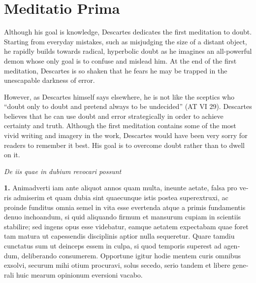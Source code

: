 \chapter{Meditatio Prima}


Although his goal is knowledge, Descartes dedicates the first meditation to doubt. Starting from everyday mistakes, such as misjudging the size of a distant object, he rapidly builds towards radical, hyperbolic doubt as he imagines an all-powerful demon whose only goal is to confuse and mislead him. At the end of the first meditation, Descartes is so shaken that he fears he may be trapped in the unescapable darkness of error.

However, as Descartes himself says elsewhere, he is not like the sceptics who ``doubt only to doubt and pretend always to be undecided'' (AT VI 29). Descartes believes that he can use doubt and error strategically in order to achieve certainty and truth. Although the first meditation contains some of the most vivid writing and imagery in the work, Descartes would have been very sorry for readers to remember it best. His goal is to overcome doubt rather than to dwell on it.

\clearpage
\begin{center}
    \beginnumbering
    \numberlinefalse
    \pstart
    \textit{De iis quae in dubium revocari possunt}
    \pend
    \endnumbering
\end{center}

\beginnumbering
\pstart
\begin{latin}
    \textenglish{\textbf{1.}} Animadverti iam ante aliquot annos quam multa, ineunte aetate, falsa pro veris admiserim et quam dubia sint quaecunque istis postea superextruxi, ac proinde funditus omnia semel in vita esse evertenda atque a primis fundamentis denuo inchoandum, si quid aliquando firmum et mansurum cupiam in scientiis stabilire; sed ingens opus esse videbatur, eamque aetatem expectabam quae foret tam matura ut capessendis disciplinis aptior nulla sequeretur. Quare tamdiu cunctatus sum ut deinceps essem in culpa, si quod temporis superest ad agendum, deliberando consumerem. Opportune igitur hodie mentem curis omnibus exsolvi, securum mihi otium procuravi, solus secedo, serio tandem et libere generali huic mearum opinionum eversioni vacabo.
\end{latin}
\pend
\endnumbering

